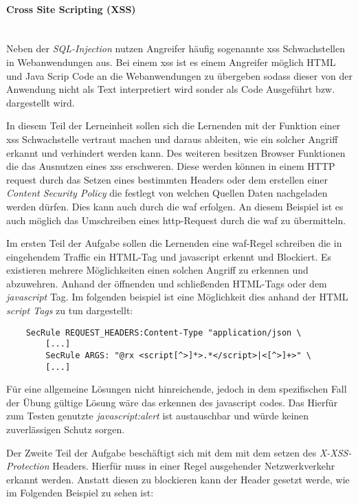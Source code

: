 \paragraph{Cross Site Scripting (XSS)}\ \\

Neben der \textit{SQL-Injection} nutzen Angreifer häufig sogenannte \ac{xss} Schwachstellen in Webanwendungen aus.
Bei einem \ac{xss} ist es einem Angreifer möglich HTML und Java Scrip Code an die Webanwendungen zu übergeben sodass dieser von der Anwendung nicht als Text interpretiert wird sonder als Code Ausgeführt bzw. dargestellt wird.

In diesem Teil der Lerneinheit sollen sich die Lernenden mit der Funktion einer \ac{xss} Schwachstelle vertraut machen und daraus ableiten, wie ein solcher Angriff erkannt und verhindert werden kann.
Des weiteren besitzen Browser Funktionen die das Ausnutzen eines \ac{xss} erschweren.
Diese werden können in einem HTTP request durch das Setzen eines bestimmten Headers oder dem erstellen einer \textit{Content Security Policy} die festlegt von welchen Quellen Daten nachgeladen werden dürfen.
Dies kann auch durch die \ac{waf} erfolgen.
An diesem Beispiel ist es auch möglich das Umschreiben eines \ac{http}-Request durch die \ac{waf} zu übermitteln.

Im ersten Teil der Aufgabe sollen die Lernenden eine \ac{waf}-Regel schreiben die in eingehendem Traffic ein HTML-Tag und javascript erkennt und Blockiert.
Es existieren mehrere Möglichkeiten einen solchen Angriff zu erkennen und abzuwehren.
Anhand der öffnenden und schließenden HTML-Tags oder dem \textit{javascript} Tag.
Im folgenden beispiel ist eine Möglichkeit dies anhand der HTML \textit{script Tags} zu tun dargestellt:

\begin{verbatim}
    SecRule REQUEST_HEADERS:Content-Type "application/json \
        [...]
        SecRule ARGS: "@rx <script[^>]*>.*</script>|<[^>]+>" \
        [...]
\end{verbatim}

Für eine allgemeine Lösungen nicht hinreichende, jedoch in dem spezifischen Fall der Übung gültige Lösung wäre das erkennen des javascript codes.
Das Hierfür zum Testen genutzte \textit{javascript:alert} ist austauschbar und würde keinen zuverlässigen Schutz sorgen.

Der Zweite Teil der Aufgabe beschäftigt sich mit dem mit dem setzen des \textit{X-XSS-Protection} Headers.
Hierfür muss in einer Regel ausgehender Netzwerkverkehr erkannt werden.
Anstatt diesen zu blockieren kann der Header gesetzt werde, wie im Folgenden Beispiel zu sehen ist:

